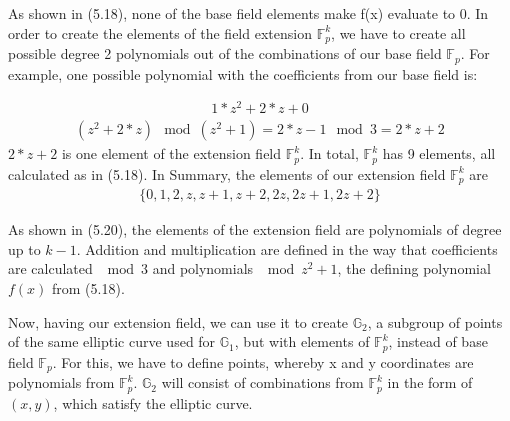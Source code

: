 As shown in (5.18), none of the base field elements make f(x) evaluate to 0. In order to create the elements of the field extension \begin{math}\mathbb{F}_p^k\end{math}, we have to create all possible degree 2 polynomials out of the combinations of our base field \begin{math}\mathbb{F}_p\end{math}. For example, one possible polynomial with the coefficients from our base field is:

\begin{align}
    1*z^2+2*z+0 
\end{align}   
\begin{align*}
    (z^2+2*z)\mod (z^2+1) = 2*z-1\mod 3 = 2*z+2
\end{align*}
\(2*z+2\) is one element of the extension field \begin{math}\mathbb{F}_p^k\end{math}. In total, \begin{math}\mathbb{F}_p^k\end{math} has 9 elements, all calculated as in (5.18). In Summary, the elements of our extension field \begin{math}\mathbb{F}_p^k\end{math} are
\begin{align}
\{0, 1, 2, z, z+1, z+2, 2z, 2z+1, 2z+2\}
\end{align}

As shown in (5.20), the elements of the extension field are polynomials of degree up to \(k-1\). Addition and multiplication are defined in the way that coefficients are calculated \(\mod 3\) and polynomials \(\mod z^2+1\), the defining polynomial  
\(f(x)\) from (5.18).

Now, having our extension field, we can use it to create \begin{math}\mathbb{G}_2\end{math}, a subgroup of points of the same elliptic curve used for \begin{math}\mathbb{G}_1\end{math}, but with elements of \begin{math}\mathbb{F}_p^k\end{math}, instead of base field \begin{math}\mathbb{F}_p\end{math}. For this, we have to define points, whereby x and y coordinates are polynomials from \begin{math}\mathbb{F}_p^k\end{math}. \begin{math}\mathbb{G}_2\end{math} will consist of combinations from \begin{math}\mathbb{F}_p^k\end{math} in the form of \((x,y)\), which satisfy the elliptic curve. 

